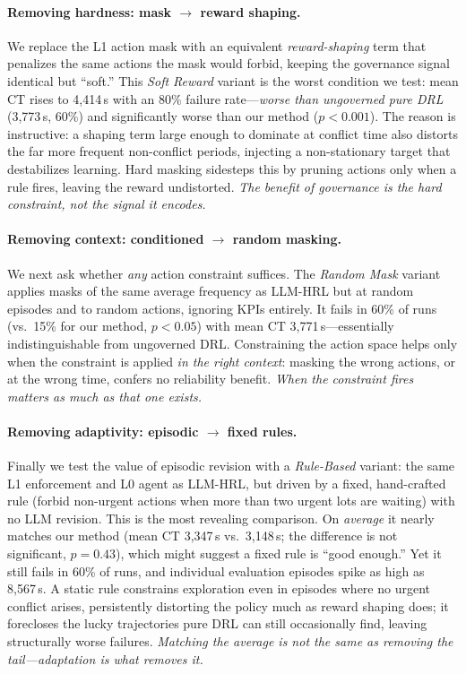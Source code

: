 \documentclass[letterpaper]{article} %
\begin{document}
\paragraph{Removing hardness: mask $\to$ reward shaping.}
We replace the L1 action mask with an equivalent \emph{reward-shaping} term that
penalizes the same actions the mask would forbid, keeping the governance signal
identical but ``soft.'' This \emph{Soft Reward} variant is the worst condition we
test: mean CT rises to 4{,}414\,s with an 80\% failure rate---\emph{worse than
ungoverned pure DRL} (3{,}773\,s, 60\%) and significantly worse than our method
($p<0.001$). The reason is instructive: a shaping term large enough to dominate
at conflict time also distorts the far more frequent non-conflict periods,
injecting a non-stationary target that destabilizes learning. Hard masking
sidesteps this by pruning actions only when a rule fires, leaving the reward
undistorted. \emph{The benefit of governance is the hard constraint, not the
signal it encodes.}

\paragraph{Removing context: conditioned $\to$ random masking.}
We next ask whether \emph{any} action constraint suffices. The \emph{Random Mask}
variant applies masks of the same average frequency as LLM-HRL but at random
episodes and to random actions, ignoring KPIs entirely. It fails in 60\% of runs
(vs.\ 15\% for our method, $p<0.05$) with mean CT 3{,}771\,s---essentially
indistinguishable from ungoverned DRL. Constraining the action space helps only
when the constraint is applied \emph{in the right context}: masking the wrong
actions, or at the wrong time, confers no reliability benefit. \emph{When the
constraint fires matters as much as that one exists.}

\paragraph{Removing adaptivity: episodic $\to$ fixed rules.}
Finally we test the value of episodic revision with a \emph{Rule-Based} variant:
the same L1 enforcement and L0 agent as LLM-HRL, but driven by a fixed,
hand-crafted rule (forbid non-urgent actions when more than two urgent lots are
waiting) with no LLM revision. This is the most revealing comparison. On
\emph{average} it nearly matches our method (mean CT 3{,}347\,s vs.\ 3{,}148\,s;
the difference is not significant, $p=0.43$), which might suggest a fixed rule is
``good enough.'' Yet it still fails in 60\% of runs, and individual evaluation
episodes spike as high as 8{,}567\,s. A static rule constrains exploration even
in episodes where no urgent conflict arises, persistently distorting the policy
much as reward shaping does; it forecloses the lucky trajectories pure DRL can
still occasionally find, leaving structurally worse failures. \emph{Matching the
average is not the same as removing the tail---adaptation is what removes it.}
\end{document}
